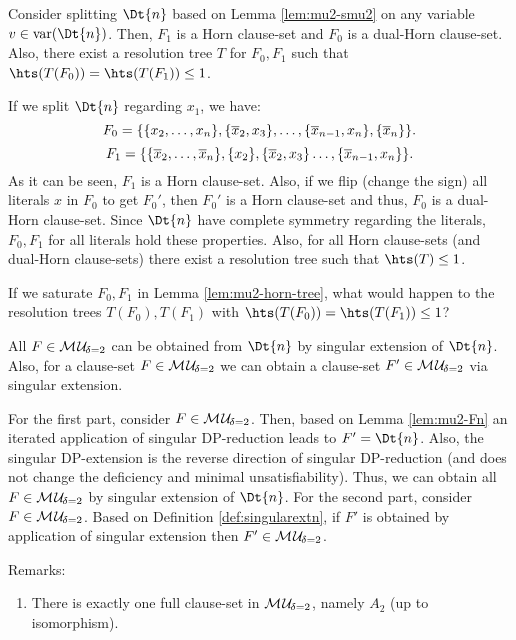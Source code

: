 \documentclass{article}
\begin{document}
\begin{lem}\label{lem:mu2-horn-tree}
Consider splitting $\Dt{n}$ based on Lemma \ref{lem:mu2-smu2} on any variable $v \in \var(\Dt{n})$. Then, $ F_1$ is a Horn clause-set and $ F_0$ is a dual-Horn clause-set. Also, there exist a resolution tree $T$ for $ F_0,F_1$ such that $\hts(T(F_0))= \hts(T(F_1)) \le 1$.
\end{lem}
\begin{prf}
If we split $\Dt{n}$ regarding $x_1$, we have:
\begin{displaymath}
F_0=\{ \{ x_2,\dots,x_n \},\{ \overline x_2,x_3 \},\dots, \{ \overline x_{n-1},x_n \},\{ \overline x_n \} \}.
\end{displaymath}
\begin{displaymath}
F_1=\{ \{ \overline x_2,\dots,\overline x_n \},\{ x_2 \},\{ \overline x_2,x_3 \}\dots, \{ \overline x_{n-1},x_n \} \}.
\end{displaymath}
As it can be seen, $F_1$ is a Horn clause-set. Also, if we flip (change the sign) all literals $x$ in  $F_0$ to get $F_0'$, then $F_0'$ is a Horn clause-set and thus, $ F_0$ is a dual-Horn clause-set. Since $\Dt{n}$ have complete symmetry regarding the literals, $F_0, F_1$ for all literals hold these properties. Also, for all Horn clause-sets (and dual-Horn clause-sets) there exist a resolution tree such that $\hts(T) \le 1$.
\end{prf}

\begin{quest}\label{que:mu-2-horn}
If we saturate $F_0, F_1$ in Lemma \ref{lem:mu2-horn-tree}, what would happen to the resolution trees $T(F_0), T(F_1)$ with $\hts(T(F_0))= \hts(T(F_1)) \le 1$?
\end{quest}

\begin{lem}\label{lem:mu2-build}
All $F \in \mathcal{M\hspace{0.8pt}U}_{\!\delta=2}$ can be obtained from $\Dt{n}$ by singular extension of  $\Dt{n}$. Also, for a clause-set $F \in \mathcal{M\hspace{0.8pt}U}_{\!\delta=2}$ we can obtain a clause-set $F' \in \mathcal{M\hspace{0.8pt}U}_{\!\delta=2}$ via singular extension.
\end{lem}
\begin{prf}
For the first part, consider $F \in \mathcal{M\hspace{0.8pt}U}_{\!\delta=2}$. Then, based on Lemma \ref{lem:mu2-Fn} an iterated application of singular DP-reduction leads to $F'=\Dt{n}$. Also, the singular DP-extension is the reverse direction of singular DP-reduction (and does not change the deficiency and minimal unsatisfiability). Thus, we can obtain all $F \in \mathcal{M\hspace{0.8pt}U}_{\!\delta=2}$ by singular extension of $\Dt{n}$. For the second part, consider $F \in \mathcal{M\hspace{0.8pt}U}_{\!\delta=2}$. Based on Definition \ref{def:singularextn}, if $F'$ is obtained by application of singular extension then $F' \in \mathcal{M\hspace{0.8pt}U}_{\!\delta=2}$.
\end{prf}
Remarks:
  \begin{enumerate}
  \item There is exactly one full clause-set in $\mathcal{M\hspace{0.8pt}U}_{\!\delta=2}$, namely $A_2$ (up to isomorphism).
  \end{enumerate}
  
\end{document}
